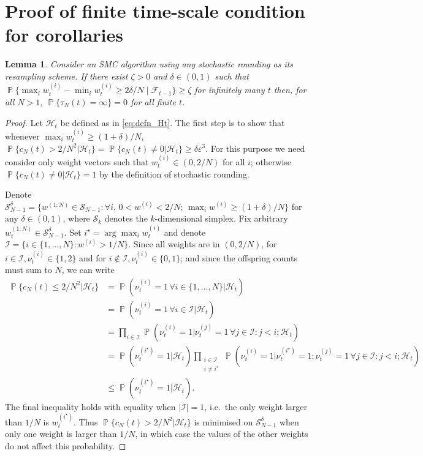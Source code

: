 \documentclass{article}
\newtheorem{lemma}{Lemma}
\theoremstyle{definition}
\DeclareMathOperator{\Prob}{\mathbb{P}}
\newcommand{\1}[1]{\mathbbm{1}_{\{#1\}}}
\begin{document}
\section{Proof of finite time-scale condition for corollaries}\label{app:finiteness}

\begin{lemma}\label{thm:SR_nontriviality}
Consider an SMC algorithm using any stochastic rounding as its resampling scheme.
If there exist $\zeta >0$ and $\delta \in (0,1)$ such that $\Prob\{\max_i w_t^{(i)} - \min_i w_t^{(i)} \geq 2\delta/N \mid \mathcal{F}_{t-1}\} \geq \zeta$ for infinitely many $t$ then, for all $N>1$, $\Prob\{\tau_N(t) = \infty \}=0$ for all finite $t$.
\end{lemma}

\begin{proof}
Let $\mathcal{H}_t$ be defined as in \eqref{eq:defn_Ht}. The first step is to show that whenever $\max_i w_t^{(i)} \geq (1+\delta)/N$, $\Prob\{ c_N(t) > 2/N^2 | \mathcal{H}_t \} = \Prob\{ c_N(t) \neq 0 | \mathcal{H}_t \} \geq \delta\varepsilon^3$.
For this purpose we need consider only weight vectors such that $w_t^{(i)} \in (0,2/N)$ for all $i$; otherwise $\Prob\{ c_N(t) \neq 0 | \mathcal{H}_t \} =1$ by the definition of stochastic rounding.

Denote $\mathcal{S}_{N-1}^\delta = \{ w^{(1:N)} \in \mathcal{S}_{N-1} :  \forall i, \, 0 <w^{(i)} <2/N ;\, \max_i w^{(i)} \geq (1 + \delta)/N \}$ for any $\delta \in (0, 1)$, where $\mathcal{S}_{k}$ denotes the $k$-dimensional simplex.
Fix arbitrary $w_t^{(1:N)} \in \mathcal{S}_{N-1}^\delta$. Set $i^\star = \arg\max_i w_t^{(i)}$ and denote $\mathcal{I} = \{i \in \{1,\dots,N\} : w^{(i)} > 1/N \}$.
Since all weights are in $(0, 2/N)$, for $i \in \mathcal{I}, \nu_t^{(i)} \in \{1,2\}$ and for $i \notin \mathcal{I}, \nu_t^{(i)} \in \{0,1\}$; and since the offspring counts must sum to $N$, we can write
\begin{align*}
\Prob\{ c_N(t) \leq 2/N^2 | \mathcal{H}_t \}
&= \Prob( \nu_t^{(i)} =1 \,\forall i\in\{1,\dots,N\} | \mathcal{H}_t )\\
&= \Prob( \nu_t^{(i)} =1 \,\forall i\in \mathcal{I} | \mathcal{H}_t ) \\
&= \prod_{i \in \mathcal{I}} \Prob( \nu_t^{(i)} =1 | \nu_t^{(j)}=1 \,\forall j \in \mathcal{I}: j<i; \mathcal{H}_t ) \\
&= \Prob( \nu_t^{(i^\star)} =1 | \mathcal{H}_t ) \prod_{\substack{i \in \mathcal{I} \\ i \neq i^\star}} \Prob( \nu_t^{(i)} =1 | \nu_t^{(i^\star)}=1; \nu_t^{(j)}=1 \,\forall j \in \mathcal{I}: j<i ; \mathcal{H}_t ) \\
&\leq \Prob( \nu_t^{(i^\star)} =1 | \mathcal{H}_t ) .
\end{align*}
The final inequality holds with equality when $|\mathcal{I}| =1$, i.e.\ the only weight larger than $1/N$ is $w_t^{(i^\star)}$.
Thus $\Prob\{ c_N(t) > 2/N^2 | \mathcal{H}_t \}$ is minimised on $\mathcal{S}_{N-1}^\delta$ when only one weight is larger than $1/N$, in which case the values of the other weights do not affect this probability. 


\end{proof}
\end{document}
